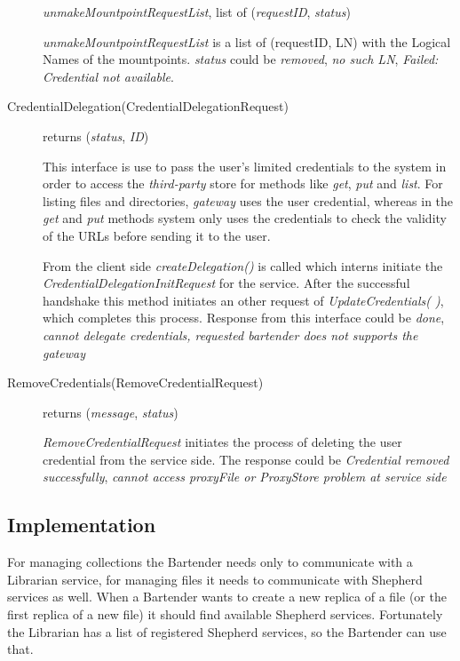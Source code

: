 \documentclass{book}
\begin{document}
\begin{description}
    \emph{unmakeMountpointRequestList}, list of (\emph{requestID}, \emph{status})	

    \emph{unmakeMountpointRequestList} is a list of (requestID, LN) with the Logical Names of the mountpoints. \emph{status} could be \emph{removed}, \emph{no such LN}, \emph{Failed: Credential not available}. 

    \item[CredentialDelegation(CredentialDelegationRequest)] returns (\emph{status}, \emph{ID})
    
    This interface is use to pass the user's limited credentials to the system in order to access the \emph{third-party} store for methods like \emph{get}, \emph{put} and \emph{list}. For listing files and directories, \emph{gateway} uses the user credential, whereas in the \emph{get} and \emph{put} methods system only uses the credentials to check the validity of the URLs before sending it to the user. 

    From the client side \emph{createDelegation()} is called which interns initiate the \emph{CredentialDelegationInitRequest} for the service. After the successful handshake this method initiates an other request of \emph{UpdateCredentials( )}, which completes this process. Response from this interface could be \emph{done}, \emph{cannot delegate credentials, requested bartender does not supports the gateway}

    \item[RemoveCredentials(RemoveCredentialRequest)] returns (\emph{message}, \emph{status})

    \emph{RemoveCredentialRequest} initiates the process of deleting the user credential from the service side. The response could be \emph{Credential removed successfully}, \emph{cannot access proxyFile or ProxyStore problem at service side} 

\end{description}


\subsection{Implementation} %

For managing collections the Bartender needs only to communicate with a Librarian service, for managing files it needs to communicate with Shepherd services as well. When a Bartender wants to create a new replica of a file (or the first replica of a new file) it should find available Shepherd services. Fortunately the Librarian has a list of registered Shepherd services, so the Bartender can use that.
\end{document}
